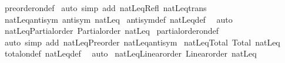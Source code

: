 \begin{isabellebody}
%
\isadelimproof
%
\endisadelimproof
%
\isatagproof
{}\isamarkupfalse%
\ preorder{\isacharunderscore}{\kern0pt}on{\isacharunderscore}{\kern0pt}def\isanewline
{}\isamarkupfalse%
\ {\isacharparenleft}{\kern0pt}auto\ simp\ add{\isacharcolon}{\kern0pt}\ natLeq{\isacharunderscore}{\kern0pt}Refl\ natLeq{\isacharunderscore}{\kern0pt}trans{\isacharparenright}{\kern0pt}%
\endisatagproof
{\isafoldproof}%
%
\isadelimproof
\isanewline
%
\endisadelimproof
\isanewline
{}\isamarkupfalse%
\ natLeq{\isacharunderscore}{\kern0pt}antisym{\isacharcolon}{\kern0pt}\ {\isachardoublequoteopen}antisym\ natLeq{\isachardoublequoteclose}\isanewline
%
\isadelimproof
%
\endisadelimproof
%
\isatagproof
{}\isamarkupfalse%
\ antisym{\isacharunderscore}{\kern0pt}def\ natLeq{\isacharunderscore}{\kern0pt}def\ \isamarkupfalse%
\ auto%
\endisatagproof
{\isafoldproof}%
%
\isadelimproof
\isanewline
%
\endisadelimproof
\isanewline
{}\isamarkupfalse%
\ natLeq{\isacharunderscore}{\kern0pt}Partial{\isacharunderscore}{\kern0pt}order{\isacharcolon}{\kern0pt}\ {\isachardoublequoteopen}Partial{\isacharunderscore}{\kern0pt}order\ natLeq{\isachardoublequoteclose}\isanewline
%
\isadelimproof
%
\endisadelimproof
%
\isatagproof
{}\isamarkupfalse%
\ partial{\isacharunderscore}{\kern0pt}order{\isacharunderscore}{\kern0pt}on{\isacharunderscore}{\kern0pt}def\isanewline
{}\isamarkupfalse%
\ {\isacharparenleft}{\kern0pt}auto\ simp\ add{\isacharcolon}{\kern0pt}\ natLeq{\isacharunderscore}{\kern0pt}Preorder\ natLeq{\isacharunderscore}{\kern0pt}antisym{\isacharparenright}{\kern0pt}%
\endisatagproof
{\isafoldproof}%
%
\isadelimproof
\isanewline
%
\endisadelimproof
\isanewline
{}\isamarkupfalse%
\ natLeq{\isacharunderscore}{\kern0pt}Total{\isacharcolon}{\kern0pt}\ {\isachardoublequoteopen}Total\ natLeq{\isachardoublequoteclose}\isanewline
%
\isadelimproof
%
\endisadelimproof
%
\isatagproof
{}\isamarkupfalse%
\ total{\isacharunderscore}{\kern0pt}on{\isacharunderscore}{\kern0pt}def\ natLeq{\isacharunderscore}{\kern0pt}def\ \isamarkupfalse%
\ auto%
\endisatagproof
{\isafoldproof}%
%
\isadelimproof
\isanewline
%
\endisadelimproof
\isanewline
{}\isamarkupfalse%
\ natLeq{\isacharunderscore}{\kern0pt}Linear{\isacharunderscore}{\kern0pt}order{\isacharcolon}{\kern0pt}\ {\isachardoublequoteopen}Linear{\isacharunderscore}{\kern0pt}order\ natLeq{\isachardoublequoteclose}\isanewline
%
\isadelimproof
%
\endisadelimproof
%
\isatagproof

\end{isabellebody}
